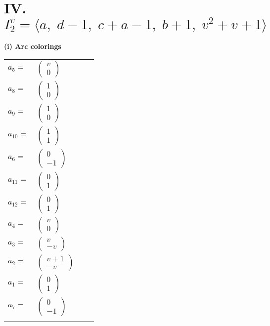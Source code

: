 \documentclass[1p]{elsarticle_modified}
\theoremstyle{definition}
\begin{document}
\centering \section*{IV. $I^v_{2}= \langle a,\;d-1,\;c+a-1,\;b+1,\;v^2+v+1 \rangle$}
\flushleft \textbf{(i) Arc colorings}\\
\begin{tabular}{m{7pt} m{180pt} m{7pt} m{180pt} }
\flushright $a_{5}=$&$\begin{pmatrix}v\\0\end{pmatrix}$ \\
\flushright $a_{8}=$&$\begin{pmatrix}1\\0\end{pmatrix}$ \\
\flushright $a_{9}=$&$\begin{pmatrix}1\\0\end{pmatrix}$ \\
\flushright $a_{10}=$&$\begin{pmatrix}1\\1\end{pmatrix}$ \\
\flushright $a_{6}=$&$\begin{pmatrix}0\\-1\end{pmatrix}$ \\
\flushright $a_{11}=$&$\begin{pmatrix}0\\1\end{pmatrix}$ \\
\flushright $a_{12}=$&$\begin{pmatrix}0\\1\end{pmatrix}$ \\
\flushright $a_{4}=$&$\begin{pmatrix}v\\0\end{pmatrix}$ \\
\flushright $a_{3}=$&$\begin{pmatrix}v\\- v\end{pmatrix}$ \\
\flushright $a_{2}=$&$\begin{pmatrix}v+1\\- v\end{pmatrix}$ \\
\flushright $a_{1}=$&$\begin{pmatrix}0\\1\end{pmatrix}$ \\
\flushright $a_{7}=$&$\begin{pmatrix}0\\-1\end{pmatrix}$\\&\end{tabular}
\end{document}
